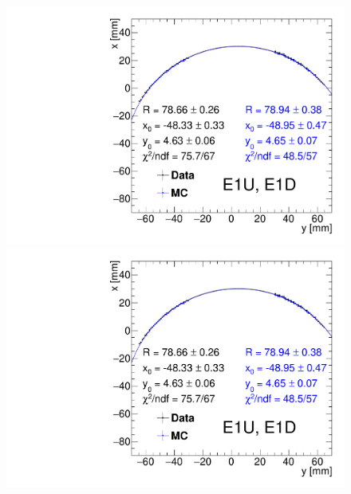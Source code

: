 \begin{figure}[hb]
{}~
\parbox{0.495\textwidth}{
  \centering
  \includegraphics[width=\linewidth,page=1]{graphics/rpSim/Apertures_swapedAxes_withFit.pdf}\\[10pt]
  \includegraphics[width=\linewidth,page=2]{graphics/rpSim/Apertures_swapedAxes_withFit.pdf}
}%
\end{figure}

